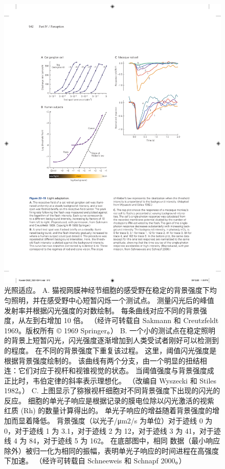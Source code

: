 \begin{figure}[htbp]
	\centering
	\includegraphics[width=1.0\linewidth]{chap22/fig_22_19}
	\caption{光照适应。 
		A. 猫视网膜神经节细胞的感受野在稳定的背景强度下均匀照明，并在感受野中心短暂闪烁一个测试点。 
		测量闪光后的峰值发射率并根据闪光强度的对数绘制。 每条曲线对应不同的背景强度，从左到右增加 10 倍。 （经许可转载自 Sakmann 和 Creutzfeldt 1969。版权所有 © 1969 Springer。） 
		B. 一个小的测试点在稳定照明的背景上短暂闪光，闪光强度逐渐增加到人类受试者刚好可以检测到的程度。 在不同的背景强度下重复该过程。 
		这里，阈值闪光强度是根据背景强度绘制的。 该曲线有两个分支，由一个明显的扭结相连：它们对应于视杆和视锥视觉的状态。 
		当阈值强度与背景强度成正比时，韦伯定律的斜率表示理想化。 （改编自 Wyszecki 和 Stiles 1982。）
		C. 上图显示了猕猴视杆细胞对不同背景强度下出现的闪光的反应。 
		细胞的单光子响应是根据记录的膜电位除以闪光激活的视紫红质 (Rh) 的数量计算得出的。 
		单光子响应的增益随着背景强度的增加而显着降低。 
		背景强度（以光子/μm2/s 为单位）对于迹线 0 为 0，对于迹线 1 为 3.1，对于迹线 2 为 12，对于迹线 3 为 41，对于迹线 4 为 84，对于迹线 5 为 162。
		在底部图中，相同 数据（最小响应除外）被归一化为相同的振幅，表明单光子响应的时间进程在高强度下加速。 （经许可转载自 Schneeweis 和 Schnapf 2000。）}
	\label{fig:22_19}
\end{figure}


